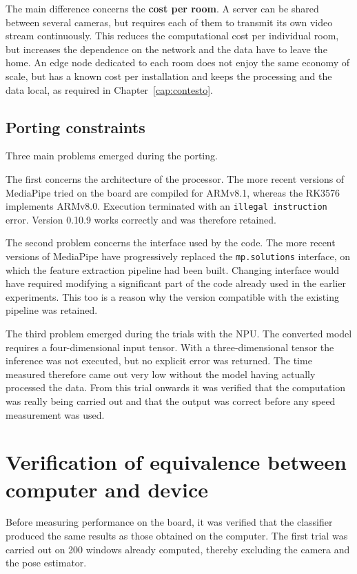The main difference concerns the \textbf{cost per room}. A server can be shared between several cameras, but requires each of them to transmit its own video stream continuously. This reduces the computational cost per individual room, but increases the dependence on the network and the data have to leave the home. An edge node dedicated to each room does not enjoy the same economy of scale, but has a known cost per installation and keeps the processing and the data local, as required in Chapter~\ref{cap:contesto}.

\subsection{Porting constraints}

Three main problems emerged during the porting.

The first concerns the architecture of the processor. The more recent versions of MediaPipe tried on the board are compiled for ARMv8.1, whereas the RK3576 implements ARMv8.0. Execution terminated with an \texttt{illegal instruction} error. Version 0.10.9 works correctly and was therefore retained.

The second problem concerns the interface used by the code. The more recent versions of MediaPipe have progressively replaced the \texttt{mp.solutions} interface, on which the feature extraction pipeline had been built. Changing interface would have required modifying a significant part of the code already used in the earlier experiments. This too is a reason why the version compatible with the existing pipeline was retained.

The third problem emerged during the trials with the NPU. The converted model requires a four-dimensional input tensor. With a three-dimensional tensor the inference was not executed, but no explicit error was returned. The time measured therefore came out very low without the model having actually processed the data. From this trial onwards it was verified that the computation was really being carried out and that the output was correct before any speed measurement was used.

\section{Verification of equivalence between computer and device}
\label{sec:parita}

Before measuring performance on the board, it was verified that the classifier produced the same results as those obtained on the computer.
The first trial was carried out on 200 windows already computed, thereby excluding the camera and the pose estimator.

